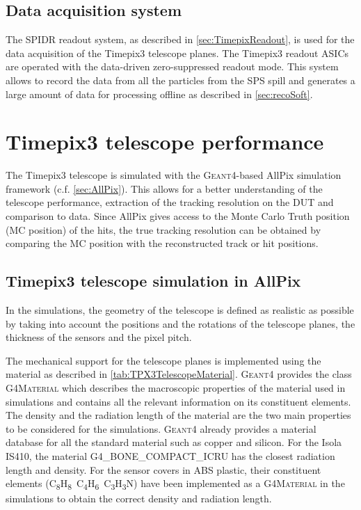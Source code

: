 \subsection{Data acquisition system}
The SPIDR readout system, as described in \cref{sec:TimepixReadout},
is used for the data acquisition of the Timepix3 telescope planes. The
Timepix3 readout ASICs are operated with the data-driven
zero-suppressed readout mode. This system allows to record the data
from all the particles from the SPS spill and generates a large amount
of data for processing offline as described in \cref{sec:recoSoft}.


\section{Timepix3 telescope performance}
\label{sec:telescopePerformance}

The Timepix3 telescope is simulated with the \textsc{Geant4}-based
AllPix simulation framework (c.f. \cref{sec:AllPix}). This allows for
a better understanding of the telescope performance, extraction of the
tracking resolution on the DUT and comparison to data. Since AllPix
gives access to the Monte Carlo Truth position (MC position) of the
hits, the true tracking resolution can be obtained by comparing the MC
position with the reconstructed track or hit positions.

\subsection{Timepix3 telescope simulation in AllPix}
In the simulations, the geometry of the telescope is defined as
realistic as possible by taking into account the positions and the
rotations of the telescope planes, the thickness of the sensors and
the pixel pitch. 

The mechanical support for the telescope planes is implemented using
the material as described in
\cref{tab:TPX3TelescopeMaterial}. \textsc{Geant4} provides the class
\textsc{G4Material} which describes the macroscopic properties of the
material used in simulations and contains all the relevant information
on its constituent elements. The density and the radiation length of
the material are the two main properties to be considered for the
simulations. \textsc{Geant4} already provides a material database for
all the standard material such as copper and silicon. For the Isola
IS410, the material G4\_BONE\_COMPACT\_ICRU has the closest radiation
length and density. For the sensor covers in ABS plastic, their
constituent elements
(C\textsubscript{8}H\textsubscript{8}~C\textsubscript{4}H\textsubscript{6}~C\textsubscript{3}H\textsubscript{3}N)
have been implemented as a \textsc{G4Material} in the simulations to
obtain the correct density and radiation length.


